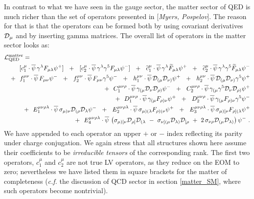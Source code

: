 \documentclass[12pt]{revtex4}
\newcommand{\wt}{\widetilde}
\newcommand{\ov}{\overline}
\newcommand{\md}{\mathcal{D}}
\begin{document}
	In contrast to what we have seen in the gauge sector, 
	the matter sector of QED is much
	richer than the set of operators presented in [{\it Myers, Pospelov}].
	The reason for that is that the operators can be formed both
	by using covariant derivatives $ \cal{D}_\mu $ and by 
	inserting gamma matrices.
	The overall list of operators in the matter sector looks as:
\begin{eqnarray}
\nonumber
\lefteqn{
	\mathcal{L}_{\rm QED}^{\rm matter} = 
	}
	\\
\nonumber
	&&
	\phantom{+~~}
	[c_1^{\mu}\cdot
	\ov{\psi}\, \gamma^\lambda F_{\mu\lambda} \psi {}^{+}] ~~+~~
	[c_2^{\mu}\cdot
	\ov{\psi}\, \gamma^\lambda \gamma^5 F_{\mu\lambda} \psi {}^{-}] ~~+~~
	\wt{c}_1^{\mu}\cdot
	\ov{\psi}\, \gamma^\lambda \wt{F}_{\mu\lambda} \psi {}^{+} ~~+~~
	\wt{c}_2^{\mu}\cdot
	\ov{\psi}\, \gamma^\lambda \gamma^5 \wt{F}_{\mu\lambda} \psi {}^{-}
	\\
\nonumber
	&&
	+~~
	f_1^{\mu\nu}\cdot
	\ov{\psi}\, F_{\mu\nu} \psi {}^{-} ~~+~~
	f_2^{\mu\nu}\cdot
	\ov{\psi}\, F_{\mu\nu} \gamma^5 \psi {}^{-} ~~+~~
	h_1^{\mu\nu}\cdot
	\ov{\psi}\, \mathcal{D}_{(\mu} \mathcal{D}_{\nu)} \psi {}^{+} ~~+~~
	h_2^{\mu\nu}\cdot
	\ov{\psi}\, \mathcal{D}_{(\mu} \mathcal{D}_{\nu)} \gamma^5 \psi {}^{+} 
	\\
\label{QED_matter}
	&&
	+~~
	C_1^{\mu\nu\rho}\cdot
	\ov{\psi}\, \gamma_{(\mu} 
		\mathcal{D}_\nu \mathcal{D}_{\rho)} \psi {}^{-} ~~+~~
	C_2^{\mu\nu\rho}\cdot
	\ov{\psi}\, \gamma_{(\mu} \gamma^5
	\mathcal{D}_\nu \mathcal{D}_{\rho)} \psi {}^{+} 
	\\
\nonumber
	&&
	+~~
	D_1^{\mu\nu\rho}\cdot
	\ov{\psi}\, \gamma_{(\mu} F_{\rho)\nu} \psi {}^{+} ~~+~~
	D_2^{\mu\nu\rho}\cdot
	\ov{\psi}\, \gamma_{(\mu} F_{\rho)\nu} \gamma^5 \psi {}^{-} 
	\\
\nonumber
	&&
	+~~
	E_1^{\mu\nu\rho\lambda}\cdot
	\ov{\psi}\, \sigma_{\mu)\nu} \mathcal{D}_{(\rho}\mathcal{D}_\lambda 
			\psi {}^{-} ~~+~~
	E_2^{\mu\nu\rho\lambda}\cdot
	\ov{\psi}\, \sigma_{\mu)(\lambda} F_{\rho)(\nu} \psi {}^{+} ~~+~~
	E_3^{\mu\nu\rho\lambda}\cdot
	\ov{\psi}\, \sigma_{\mu)[\nu} F_{\rho](\lambda} \psi {}^{+} 
	\\
\nonumber
	&&
	+~~
	E_4^{\mu\nu\rho\lambda}\cdot
	\ov{\psi}\, \left ( 
		\sigma_{\mu)[\nu} \mathcal{D}_{\rho]}\mathcal{D}_{(\lambda}
		~-~
		\sigma_{\nu](\mu} \mathcal{D}_{\lambda)}\mathcal{D}_{[\rho}
		~+~
		2\, \sigma_{\nu\rho} \md_{(\mu} \md_{\lambda)}
		\right ) \psi {}^{-} 
	~.
\end{eqnarray}
	We have appended to each operator an upper $+$ or $-$ index reflecting
	its parity under charge conjugation.
	We again stress that all structures shown here assume
	their coefficients to be {\it irreducible tensors} of the 
	corresponding rank. 
	The first two operators, $ c_1^\mu $ and $ c_2^\mu $ are not true
	LV operators, as they reduce on the EOM to zero; 
	nevertheless we have listed them in square brackets 
	for the matter of completeness
	({\it c.f.} the discussion of QCD sector in section \ref{matter_SM},
	where such operators become nontrivial).
\end{document}
